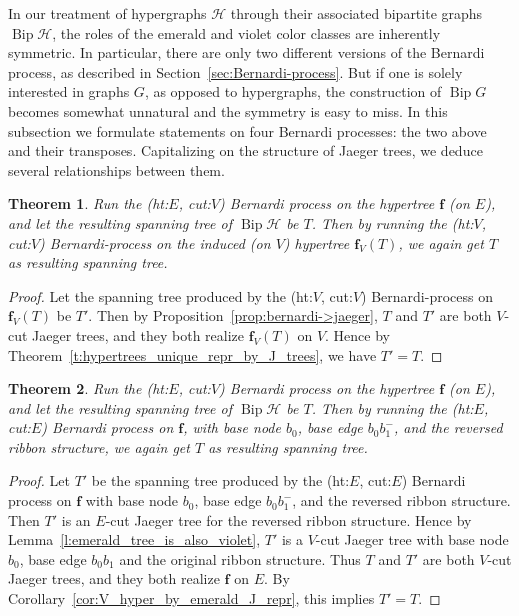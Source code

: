 \documentclass[10pt]{amsart}
\newtheorem{theo}{Theorem}[section]
\theoremstyle{definition}\newtheorem{defi}[theo]{Definition}
\theoremstyle{remark}\newtheorem{rema}[theo]{Remark}
\newcommand{\HH}{\mathcal H}
\DeclareMathOperator{\bip}{Bip}
\begin{document}
In our treatment of hypergraphs $\HH$ through their associated bipartite graphs $\bip\HH$, the roles of the emerald and violet color classes are inherently symmetric. In particular, there are only two different versions of the Bernardi process, as described in Section~\ref{sec:Bernardi-process}. But if one is solely interested in graphs $G$, as opposed to hypergraphs, the construction of $\bip G$ becomes somewhat unnatural and the symmetry is easy to miss. In this subsection we formulate statements on four Bernardi processes: the two above and their transposes. Capitalizing on the structure of Jaeger trees, we deduce several relationships between them.

\begin{theo}
Run the (ht:$E$, cut:$V$) Bernardi process on the hypertree $\mathbf f$ (on $E$), and let the resulting spanning tree of $\bip \HH$ be $T$. Then by running the (ht:$V$, cut:$V$) Bernardi-process on the induced (on $V$) hypertree $\mathbf f_V(T)$, we again get $T$ as resulting spanning tree.
\end{theo}

\begin{proof}
Let the spanning tree produced by the (ht:$V$, cut:$V$) Bernardi-process on $\mathbf f_V(T)$ be $T'$. Then by Proposition~\ref{prop:bernardi->jaeger}, $T$ and $T'$ are both $V$-cut Jaeger trees, and they both realize $\mathbf f_V(T)$ on $V$. Hence by Theorem~\ref{t:hypertrees_unique_repr_by_J_trees}, we have $T'=T$.
\end{proof}

\begin{theo}\label{thm:inverses}
Run the (ht:$E$, cut:$V$) Bernardi process on the hypertree $\mathbf f$ (on $E$), and let the resulting spanning tree of $\bip \HH$ be $T$. Then by running the (ht:$E$, cut:$E$) Bernardi process on $\mathbf f$, with base node $b_0$, base edge $b_0b_1^-$, and the reversed ribbon structure, we again get $T$ as resulting spanning tree.
\end{theo}

\begin{proof}
Let $T'$ be the spanning tree produced by the (ht:$E$, cut:$E$) Bernardi process on $\mathbf f$ with base node $b_0$, base edge $b_0b_1^-$, and the reversed ribbon structure. Then $T'$ is an $E$-cut Jaeger tree for the reversed ribbon structure. Hence by Lemma~\ref{l:emerald_tree_is_also_violet}, $T'$ is a $V$-cut Jaeger tree with base node $b_0$, base edge $b_0b_1$ and the original ribbon structure. Thus $T$ and $T'$ are both $V$-cut Jaeger trees, and they both realize $\mathbf f$ on $E$. By Corollary~\ref{cor:V_hyper_by_emerald_J_repr}, this implies $T'=T$.
\end{proof}
\end{document}
